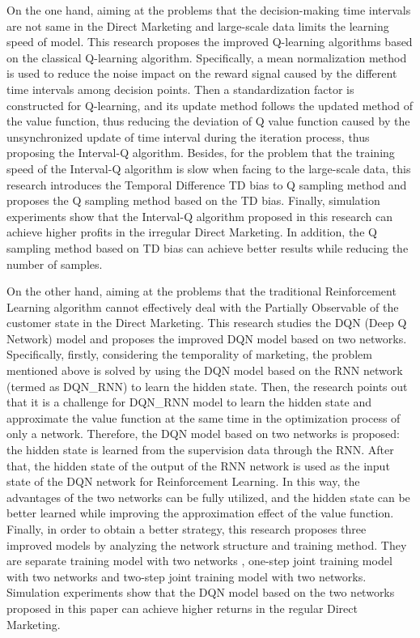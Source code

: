 \begin{enabstract}
On the one hand, aiming at the problems that the decision-making time intervals are not same in the Direct Marketing and large-scale data limits the learning speed of model. This research proposes the improved Q-learning algorithms based on the classical Q-learning algorithm. Specifically, a mean normalization method is used to reduce the noise impact on the reward signal caused by the different time intervals among decision points. Then a standardization factor is constructed for Q-learning, and its update method follows the updated method of the value function, thus reducing the deviation of Q value function caused by the unsynchronized update of time interval during the iteration process, thus proposing the Interval-Q algorithm. Besides, for the problem that the training speed of the Interval-Q algorithm is slow when facing to the large-scale data, this research introduces the Temporal Difference TD bias to Q sampling method and proposes the Q sampling method based on the TD bias. Finally, simulation experiments show that the Interval-Q algorithm proposed in this research can achieve higher profits in the irregular Direct Marketing. In addition, the Q sampling method based on TD bias can achieve better results while reducing the number of samples.

On the other hand, aiming at the problems that the traditional Reinforcement Learning algorithm cannot effectively deal with the Partially Observable of the customer state in the Direct Marketing. This research studies the DQN (Deep Q Network) model and proposes the improved DQN model based on two networks. Specifically, firstly, considering the temporality of marketing, the problem mentioned above is solved by using the DQN model based on the RNN network (termed as DQN_RNN) to learn the hidden state. Then, the research points out that it is a challenge for DQN_RNN model to learn the hidden state and approximate the value function at the same time in the optimization process of only a network. Therefore, the DQN model based on two networks is proposed: the hidden state is learned from the supervision data through the RNN. After that, the hidden state of the output of the RNN network is used as the input state of the DQN network for Reinforcement Learning. In this way, the advantages of the two networks can be fully utilized, and the hidden state can be better learned while improving the approximation effect of the value function. Finally, in order to obtain a better strategy, this research proposes three improved models by analyzing the network structure and training method. They are separate training model with two networks , one-step joint training model with two networks and two-step joint training model with two networks. Simulation experiments show that the DQN model based on the two networks proposed in this paper can achieve higher returns in the regular Direct Marketing.


\end{enabstract}